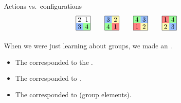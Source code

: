 \documentclass[8pt,handout]{beamer}
\newcommand{\Pause}{}      %
\begin{document}
\begin{frame}{Actions vs.\ configurations}
\[\begin{tikzpicture}[scale=.75]
      \path[fill=actBlue] (0,0) rectangle ++(.5,.5);
      \path[fill=actGreen] (.5,0) rectangle ++(.5,.5);
      \draw (0,0) rectangle (1,1);
      \draw (.25,.75) node{$2$}; \draw (.75,.75) node{$1$};
      \draw (.25,.25) node{$3$}; \draw (.75,.25) node{$4$};
    \end{tikzpicture}
    \qquad
    \begin{tikzpicture}[scale=.75]
      \path[fill=actBlue] (0,.5) rectangle ++(.5,.5); 
      \path[fill=actYellow] (.5,.5) rectangle ++(.5,.5);
      \path[fill=actGreen] (0,0) rectangle ++(.5,.5);
      \path[fill=actRed] (.5,0) rectangle ++(.5,.5);
      \draw (0,0) rectangle (1,1);
      \draw (.25,.75) node{$3$}; \draw (.75,.75) node{$2$};
        \draw (.25,.25) node{$4$}; \draw (.75,.25) node{$1$};
    \end{tikzpicture}
    \qquad
    \begin{tikzpicture}[scale=.75]
      \path[fill=actGreen] (0,.5) rectangle ++(.5,.5); 
      \path[fill=actBlue] (.5,.5) rectangle ++(.5,.5);
      \path[fill=actRed] (0,0) rectangle ++(.5,.5);
      \path[fill=actYellow] (.5,0) rectangle ++(.5,.5);
      \draw (0,0) rectangle (1,1);
      \draw (.25,.75) node{$4$}; \draw (.75,.75) node{$3$};
      \draw (.25,.25) node{$1$}; \draw (.75,.25) node{$2$};
    \end{tikzpicture}
    \qquad
    \begin{tikzpicture}[scale=.75]
      \path[fill=actRed] (0,.5) rectangle ++(.5,.5); 
      \path[fill=actGreen] (.5,.5) rectangle ++(.5,.5);
      \path[fill=actYellow] (0,0) rectangle ++(.5,.5);
      \path[fill=actBlue] (.5,0) rectangle ++(.5,.5);
      \draw (0,0) rectangle (1,1);
      \draw (.25,.75) node{$1$}; \draw (.75,.75) node{$4$};
      \draw (.25,.25) node{$2$}; \draw (.75,.25) node{$3$};
    \end{tikzpicture}
    \]

  \medskip\Pause

  When we were just learning about groups, we made an . \smallskip


  \begin{itemize}
    \item The  corresponded to the
      . \smallskip\Pause
    \item The  corresponded to . \smallskip\Pause
    \item The  corresponded to  (group
      elements).
  \end{itemize}

\end{frame}
\end{document}
